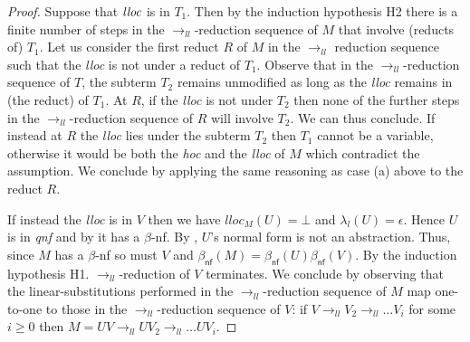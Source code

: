 \documentclass[xchauthor,chkrefs,GCNS,amsmath,amsthm,rotating,leaveRGB]{tcsg}
\theoremstyle{plain}
\theoremstyle{definition}
\newcommand{\llred}{\rightarrow_{ll}}
\begin{document}
\begin{proof}
Suppose that $\emph{lloc}$ is in $T_{1}$. Then by the induction hypothesis H2
there is a finite number of steps in the $\llred $-reduction sequence of $M$
that involve (reducts of) $T_{1}$. Let us consider the first reduct $R$ of
$M$ in the $\llred $ reduction sequence such that the \emph{lloc} is not
under a reduct of $T_{1}$.  Observe that in the $\llred $-reduction sequence
of $T$, the subterm $T_{2}$ remains unmodified as long as the \emph{lloc}
remains in (the reduct) of $T_{1}$. At $R$, if the \emph{lloc} is not under
$T_{2}$ then none of the further steps in the $\llred $-reduction sequence of
$R$ will involve $T_{2}$. We can thus conclude. If instead at $R$ the
\emph{lloc} lies under the subterm $T_{2}$ then $T_{1}$ cannot be a variable,
otherwise it would be both the \emph{hoc} and the \emph{lloc} of $M$ which
contradict the assumption. We conclude by applying the same reasoning as case
(a) above to the reduct $R$.


If instead the \emph{lloc} is in $V$ then we have $lloc_{M}(U) =\bot $ and
$\lambda _{l}(U)=\epsilon $. Hence $U$ is in \emph{qnf} and by
 it has a $\beta $-nf. By
, $U$'s normal form
is not an abstraction. Thus, since $M$ has a $\beta $-nf so must $V$ and
$\beta _{\mathsf{nf}}(M) = \beta _{\mathsf{nf}}(U) \beta _{\mathsf{nf}}(V)$.
By the induction hypothesis H1.  $\llred $-reduction of $V$ terminates. We
conclude by observing that the linear-substitutions performed in the $\llred
$-reduction sequence of $M$ map one-to-one to those in the $\llred
$-reduction sequence of $V$: if $V \llred V_{2} \llred \ldots V_{i}$ for some
$i\geq 0$ then $M = U V \llred U V_{2} \llred \ldots U V_{i}$.
\end{proof}
\end{document}
